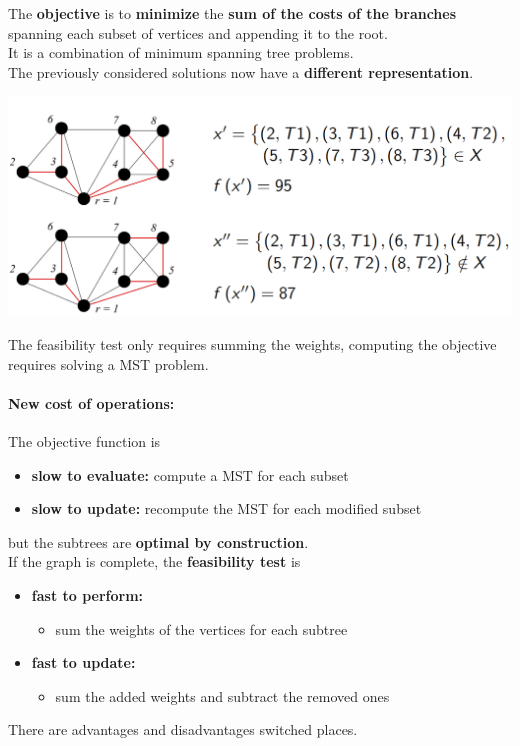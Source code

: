 The \textbf{objective} is to \textbf{minimize} the \textbf{sum of the costs of the branches} spanning each subset of vertices and appending it to the root.\\
It is a combination of minimum spanning tree problems.\\

The previously considered solutions now have a \textbf{different representation}.
\begin{center}
	\includegraphics[width=0.9\columnwidth]{img/CSTP2}
\end{center}
The feasibility test only requires summing the weights, computing the objective requires solving a MST problem.

\newpage

\paragraph{New cost of operations:} The objective function is
\begin{itemize}
	\item \textbf{slow to evaluate:} compute a MST for each subset
	\item \textbf{slow to update:} recompute the MST for each modified subset
\end{itemize}
but the subtrees are \textbf{optimal by construction}.\\

If the graph is complete, the \textbf{feasibility test} is
\begin{itemize}
	\item \textbf{fast to perform:}
	\begin{itemize}
		\item sum the weights of the vertices for each subtree
	\end{itemize}
	\item \textbf{fast to update:}
	\begin{itemize}
		\item sum the added weights and subtract the removed ones
	\end{itemize}
\end{itemize}
There are advantages and disadvantages switched places.\\

